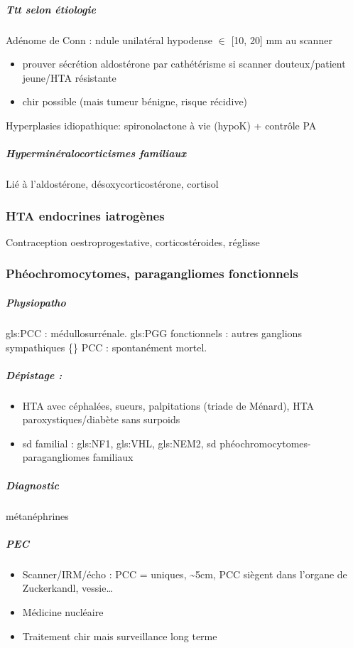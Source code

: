 \documentclass[11pt]{article}
\begin{document}
\subparagraph{Ttt selon étiologie}
\label{sec:org5efcec6}
Adénome de Conn : ndule unilatéral hypodense \(\in\) [10, 20] mm au scanner
\begin{itemize}
\item prouver sécrétion aldostérone par cathétérisme si scanner douteux/patient jeune/HTA résistante
\item chir possible (mais tumeur bénigne, risque récidive)
\end{itemize}
Hyperplasies idiopathique: spironolactone à vie (hypoK) + contrôle PA

\subparagraph{Hyperminéralocorticismes familiaux}
\label{sec:orga65a623}
Lié à l'aldostérone, désoxycorticostérone, cortisol

\subsubsection{HTA endocrines iatrogènes}
\label{sec:org73c7c4f}
Contraception oestroprogestative, corticostéroides, réglisse

\subsubsection{Phéochromocytomes, paragangliomes fonctionnels}
\label{sec:org1606065}
\subparagraph{Physiopatho}
\label{sec:orgb63880f}
gls:PCC : médullosurrénale. gls:PGG fonctionnels : autres    ganglions sympathiques
 \{\} PCC : spontanément mortel. 

\subparagraph{Dépistage :}
\label{sec:org5f0c42c}
\begin{itemize}
\item HTA avec céphalées, sueurs, palpitations (triade de Ménard), HTA paroxystiques/diabète sans
surpoids
\item sd familial : gls:NF1, gls:VHL, gls:NEM2, sd phéochromocytomes-paragangliomes familiaux
\end{itemize}

\subparagraph{Diagnostic}
\label{sec:org9129ab4}
\inc métanéphrines

\subparagraph{PEC}
\label{sec:orgd07afbd}
\begin{itemize}
\item Scanner/IRM/écho : PCC = uniques, \textasciitilde{}5cm, PCC siègent dans l'organe de Zuckerkandl, vessie\ldots{}
\item Médicine nucléaire
\item Traitement chir mais surveillance long terme
\end{itemize}
\end{document}
